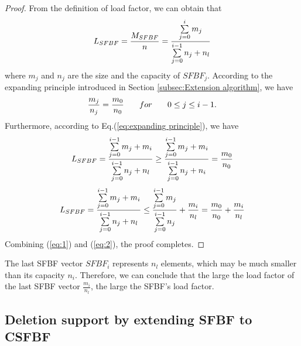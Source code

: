 \documentclass[10pt,journal,compsoc]{IEEEtran}
\newtheorem{proof}{Proof}
\newcommand{\note}[1]{{\sffamily\itshape\bfseries\uline{#1}}}
\begin{document}
\begin{proof}
From the definition of load factor, we can obtain that
\begin{equation}
\footnotesize
{L_{SFBF}} = \frac{{{M_{SFBF}}}}{n} = \frac{{\sum\limits_{j = 0}^i {{m_j}} }}{{\sum\limits_{j = 0}^{i - 1} {{n_j} + n_l} }}
\end{equation}
where $m_j$ and $n_j$ are the size and the capacity of $SFBF_j$.
According to the expanding principle introduced in Section \ref{subsec:Extension algorithm}, we have
\begin{equation}
\footnotesize
\frac{{{m_j}}}{{{n_j}}} = \frac{{{m_0}}}{{{n_0}}} \qquad  for  \qquad  0 \le j \le i - 1.
\label{eq:expanding principle}
\end{equation}
Furthermore, according to Eq.(\ref{eq:expanding principle}), we have
\begin{equation}
\footnotesize
{L_{SFBF}} = \frac{{\sum\limits_{j = 0}^{i - 1} {{m_j} + {m_i}} }}{{\sum\limits_{j = 0}^{i - 1} {{n_j} + n_{l}} }} \ge \frac{{\sum\limits_{j = 0}^{i - 1} {{m_j} + {m_i}} }}{{\sum\limits_{j = 0}^{i - 1} {{n_j} + {n_i}} }} = \frac{{{m_0}}}{{{n_0}}}
\label{eq:1}
\end{equation}
\begin{equation}
\footnotesize
{L_{SFBF}} = \frac{{\sum\limits_{j = 0}^{i - 1} {{m_j} + {m_i}} }}{{\sum\limits_{j = 0}^{i - 1} {{n_j} + n_{l}} }} \le \frac{{\sum\limits_{j = 0}^{i - 1} {{m_j}} }}{{\sum\limits_{j = 0}^{i - 1} {{n_j}} }} + \frac{{{m_i}}}{n_{l}} = \frac{{{m_0}}}{{{n_0}}} + \frac{{{m_i}}}{n_{l}}
\label{eq:2}
\end{equation}
Combining (\ref{eq:1}) and (\ref{eq:2}), the proof completes.
\end{proof}

The last SFBF vector $SFBF_i$ represents $n_l$ elements,
  which may be much smaller than its capacity $n_i$.
Therefore, we can conclude that the large the load factor of the last SFBF vector $\frac{m_i}{n_{l}}$, the large the SFBF's load factor.


\subsection{Deletion support by extending SFBF to CSFBF}
\end{document}
